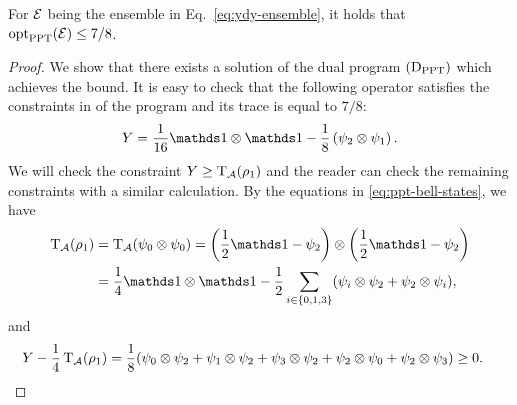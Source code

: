 \begin{theorem}
\label{thm:dual-ppt-ydy}
For $\mathcal{E}$ being the ensemble in Eq.~\eqref{eq:ydy-ensemble}, it holds that $\operatorname{opt}_{\mathrm{PPT}}(\mathcal{E})\leq 7/8$.
\end{theorem}
\begin{proof}
We show that there exists a solution of the dual program $(\textup{D}_{\mathrm{PPT}})$ which achieves the bound.
It is easy to check that the following operator satisfies the constraints in of the program 
and its trace is equal to $7/8$:
\[
Y = \frac{1}{16}\I\otimes\I - \frac{1}{8}\left(\psi_{2}\otimes\psi_{1}\right).
\]
We will check the constraint $Y \geq \operatorname{T}_{\mathcal{A}}(\rho_1)$ and the reader can check the remaining constraints with
a similar calculation. By the equations in \eqref{eq:ppt-bell-states}, we have
\begin{align*}
 \pt_{\A}(\rho_{1}) &= \pt_{\A}(\psi_{0}\otimes\psi_{0}) = \left(\frac{1}{2}\I - \psi_{2}\right)\otimes\left(\frac{1}{2}\I - \psi_{2}\right) \\
&= \frac{1}{4}\I\otimes\I - \frac{1}{2}\sum_{i\in\{0,1,3\}}(\psi_{i}\otimes\psi_{2}+\psi_{2}\otimes\psi_{i}),
\end{align*}
and
\begin{align*}
 Y - \frac{1}{4}\operatorname{T}_{\mathcal{A}}(\rho_{1}) &= \frac{1}{8}(\psi_{0}\otimes\psi_{2}+\psi_{1}\otimes\psi_{2}+\psi_{3}\otimes\psi_{2}
+\psi_{2}\otimes\psi_{0}+\psi_{2}\otimes\psi_{3}) \geq 0.
\end{align*}
\end{proof}

